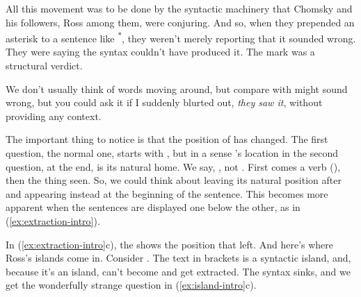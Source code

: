 All this movement was to be done by the syntactic machinery that Chomsky and his followers, Ross among them, were conjuring. And so, when they prepended an asterisk to a sentence like \textsuperscript{*}, they weren't merely reporting that it sounded wrong. They were saying the syntax couldn't have produced it. The mark was a structural verdict.

\bigskip

We don't usually think of words moving around, but compare  with   might sound wrong, but you could ask it if I suddenly blurted out, \textit{they saw it}, without providing any context.

The important thing to notice is that the position of  has changed. The first question, the normal one, starts with , but in a sense 's location in the second question, at the end, is its natural home. We say, , not . First comes a verb (), then the thing seen. So, we could think about  leaving its natural position after  and appearing instead at the beginning of the sentence. This becomes more apparent when the sentences are displayed one below the other, as in (\ref{ex:extraction-intro}).

\ea
\label{ex:extraction-intro}
\z\z

In (\ref{ex:extraction-intro}c), the \mentionhead{\underline{~~~}} shows the position that  left. And here's where Ross's islands come in. Consider . The text in brackets is a syntactic island, and, because it's an island,  can't become  and get extracted. The syntax sinks, and we get the wonderfully strange question in (\ref{ex:island-intro}c).

